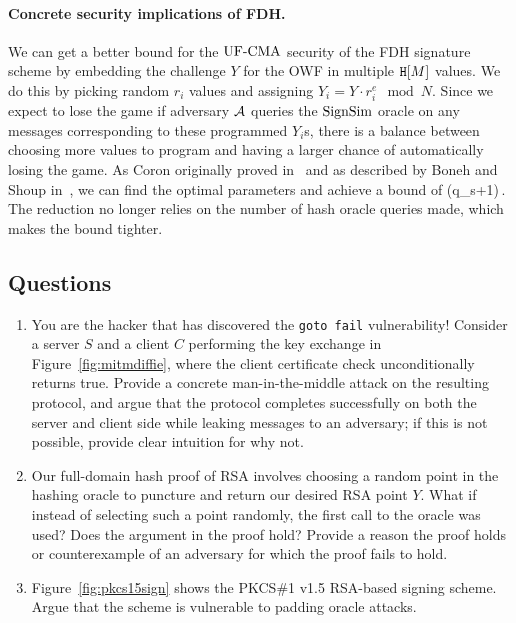 \paragraph{Concrete security implications of FDH.} 
We can get a better bound for the $\textnormal{UF-CMA}$ security of the FDH signature scheme by embedding the challenge $Y$ for the OWF in multiple $\mathtt{H}[M]$ values. We do this by picking random $r_i$ values and assigning $Y_i=Y\cdot r_i^e\mod N$. Since we expect to lose the game if adversary ${\mathcal A}$ queries the $\textnormal{SignSim}$ oracle on any messages corresponding to these programmed $Y_i$s, there is a balance between choosing more values to program and having a larger chance of automatically losing the game. As Coron originally proved in~\cite{coron2000exact} and as described by Boneh and Shoup in~\cite{BonehShoupBook}, we can find the optimal parameters and achieve a bound of
\bnm
\AdvUFCMA{\DS}{\advA}\cdot(q_s+1)\cdot {}\,.
\enm
The reduction no longer relies on the number of hash oracle queries made, which makes the bound tighter. 
\subsection{Questions}

\begin{enumerate}
\item You are the hacker that has discovered the \texttt{goto fail} vulnerability!  Consider a server $S$ and a client $C$ performing the key exchange in Figure~\ref{fig:mitmdiffie}, where the client certificate check unconditionally returns true.  Provide a concrete man-in-the-middle attack on the resulting protocol, and argue that the protocol completes successfully on both the server and client side while leaking messages to an adversary; if this is not possible, provide clear intuition for why not.
\item Our full-domain hash proof of RSA involves choosing a random point in the hashing oracle to puncture and return our desired RSA point $Y$.  What if instead of selecting such a point randomly, the first call to the oracle was used?  Does the argument in the proof hold?  Provide a reason the proof holds or counterexample of an adversary for which the proof fails to hold.
\item Figure~\ref{fig:pkcs15sign} shows the PKCS\#1 v1.5 RSA-based signing scheme.  Argue that the scheme is vulnerable to padding oracle attacks.
\end{enumerate}